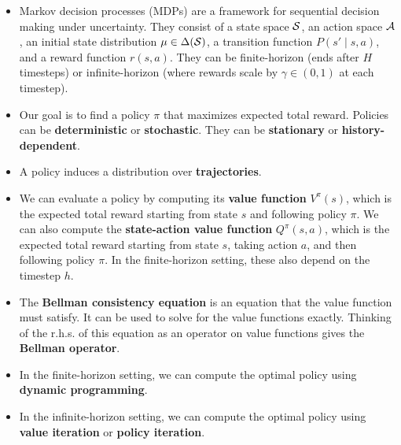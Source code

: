 \documentclass[../main/main]{subfiles}
\begin{document}
\begin{itemize}
    \item Markov decision processes (MDPs) are a framework for sequential decision making under uncertainty. They consist of a state space $\S$, an action space $\A$, an initial state distribution $\mu \in \Delta(\S)$, a transition function $P(s' \mid s, a)$, and a reward function $r(s, a)$. They can be finite-horizon (ends after $H$ timesteps) or infinite-horizon (where rewards scale by $\gamma \in (0, 1)$ at each timestep).
    \item Our goal is to find a policy $\pi$ that maximizes expected total reward. Policies can be \textbf{deterministic} or \textbf{stochastic}. They can be \textbf{stationary} or \textbf{history-dependent}.
    \item A policy induces a distribution over \textbf{trajectories}.
    \item We can evaluate a policy by computing its \textbf{value function} $V^\pi(s)$, which is the expected total reward starting from state $s$ and following policy $\pi$. We can also compute the \textbf{state-action value function} $Q^\pi(s, a)$, which is the expected total reward starting from state $s$, taking action $a$, and then following policy $\pi$. In the finite-horizon setting, these also depend on the timestep $h$.
    \item The \textbf{Bellman consistency equation} is an equation that the value function must satisfy. It can be used to solve for the value functions exactly. Thinking of the r.h.s. of this equation as an operator on value functions gives the \textbf{Bellman operator}.
    \item In the finite-horizon setting, we can compute the optimal policy using \textbf{dynamic programming}.
    \item In the infinite-horizon setting, we can compute the optimal policy using \textbf{value iteration} or \textbf{policy iteration}.
\end{itemize}
\end{document}
